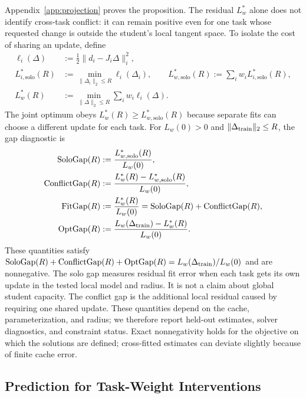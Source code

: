 Appendix~\ref{app:projection} proves the proposition. The residual $L_w^*$
alone does not identify cross-task conflict: it can remain positive even for
one task whose requested change is outside the student's local tangent space.
To isolate the cost of sharing an update, define
\begin{align}
    \ell_i(\Delta)
    &:=\frac12\|d_i-J_i\Delta\|_i^2,\\
    L_{i,\mathrm{solo}}^*(R)
    &:=\min_{\|\Delta_i\|_2\le R}\ell_i(\Delta_i),
    \qquad
    L_{w,\mathrm{solo}}^*(R)
    :=\sum_iw_iL_{i,\mathrm{solo}}^*(R),\\
    L_w^*(R)
    &:=\min_{\|\Delta\|_2\le R}\sum_iw_i\ell_i(\Delta).
    \label{eq:solo_joint_fit}
\end{align}
The joint optimum obeys
$L_w^*(R)\ge L_{w,\mathrm{solo}}^*(R)$ because separate fits can choose a
different update for each task. For $L_w(0)>0$ and
$\|\Delta_{\rm train}\|_2\le R$, the gap diagnostic is
\begin{align}
    \mathrm{SoloGap}(R)
    &:=\frac{L_{w,\mathrm{solo}}^*(R)}{L_w(0)},\\
    \mathrm{ConflictGap}(R)
    &:=\frac{L_w^*(R)-L_{w,\mathrm{solo}}^*(R)}{L_w(0)},\\
    \mathrm{FitGap}(R)
    &:=\frac{L_w^*(R)}{L_w(0)}
    =\mathrm{SoloGap}(R)+\mathrm{ConflictGap}(R),\\
    \mathrm{OptGap}(R)
    &:=\frac{L_w(\Delta_{\rm train})-L_w^*(R)}{L_w(0)}.
    \label{eq:gap_diagnostics}
\end{align}
These quantities satisfy
$\mathrm{SoloGap}(R)+\mathrm{ConflictGap}(R)+\mathrm{OptGap}(R)
=L_w(\Delta_{\rm train})/L_w(0)$ and are nonnegative. The solo gap measures
residual fit error when each task gets its own update in the tested local
model and radius. It is not a claim about global student capacity. The
conflict gap is the additional local residual caused by requiring one shared
update. These quantities depend on the cache, parameterization, and radius;
we therefore report held-out estimates, solver diagnostics, and constraint
status. Exact nonnegativity holds for the objective on which the solutions
are defined; cross-fitted estimates can deviate slightly because of finite
cache error.


\subsection{Prediction for Task-Weight Interventions}
\label{sec:weight_response}

